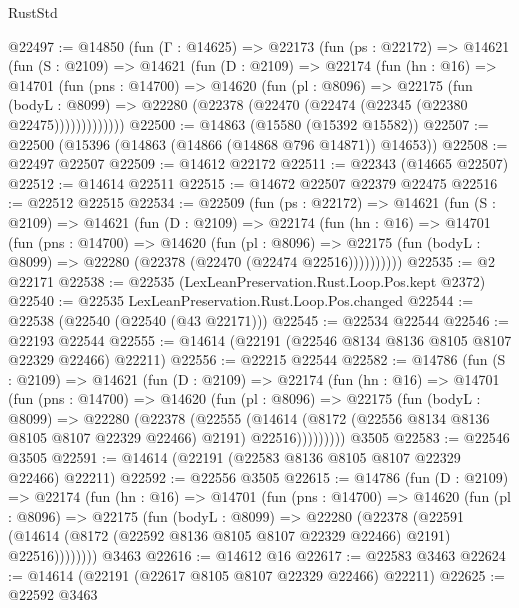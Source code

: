 \begin{lexlean}{RustStd}
\begin{coremodule}
@22497 := @14850
    (fun (Γ : @14625) =>
    @22173
      (fun (ps : @22172) =>
      @14621
        (fun (S : @2109) =>
        @14621
          (fun (D : @2109) =>
          @22174
            (fun (hn : @16) =>
            @14701
              (fun (pns : @14700) =>
              @14620
                (fun (pl : @8096) =>
                @22175
                  (fun (bodyL : @8099) =>
                  @22280 (@22378 (@22470 (@22474 (@22345 (@22380 @22475)))))))))))))
@22500 := @14863 (@15580 (@15392 @15582))
@22507 := @22500 (@15396 (@14863 (@14866 (@14868 @796 @14871)) @14653))
@22508 := @22497 @22507
@22509 := @14612 @22172
@22511 := @22343 (@14665 @22507)
@22512 := @14614 @22511
@22515 := @14672 @22507 @22379 @22475
@22516 := @22512 @22515
@22534 := @22509
    (fun (ps : @22172) =>
    @14621
      (fun (S : @2109) =>
      @14621
        (fun (D : @2109) =>
        @22174
          (fun (hn : @16) =>
          @14701
            (fun (pns : @14700) =>
            @14620
              (fun (pl : @8096) =>
              @22175 (fun (bodyL : @8099) => @22280 (@22378 (@22470 (@22474 @22516))))))))))
@22535 := @2 @22171
@22538 := @22535 (LexLeanPreservation.Rust.Loop.Pos.kept @2372)
@22540 := @22535 LexLeanPreservation.Rust.Loop.Pos.changed
@22544 := @22538 (@22540 (@22540 (@43 @22171)))
@22545 := @22534 @22544
@22546 := @22193 @22544
@22555 := @14614 (@22191 (@22546 @8134 @8136 @8105 @8107 @22329 @22466) @22211)
@22556 := @22215 @22544
@22582 := @14786
    (fun (S : @2109) =>
    @14621
      (fun (D : @2109) =>
      @22174
        (fun (hn : @16) =>
        @14701
          (fun (pns : @14700) =>
          @14620
            (fun (pl : @8096) =>
            @22175
              (fun (bodyL : @8099) =>
              @22280
                (@22378
                  (@22555
                    (@14614
                      (@8172 (@22556 @8134 @8136 @8105 @8107 @22329 @22466) @2191)
                      @22516)))))))))
    @3505
@22583 := @22546 @3505
@22591 := @14614 (@22191 (@22583 @8136 @8105 @8107 @22329 @22466) @22211)
@22592 := @22556 @3505
@22615 := @14786
    (fun (D : @2109) =>
    @22174
      (fun (hn : @16) =>
      @14701
        (fun (pns : @14700) =>
        @14620
          (fun (pl : @8096) =>
          @22175
            (fun (bodyL : @8099) =>
            @22280
              (@22378
                (@22591
                  (@14614 (@8172 (@22592 @8136 @8105 @8107 @22329 @22466) @2191) @22516))))))))
    @3463
@22616 := @14612 @16
@22617 := @22583 @3463
@22624 := @14614 (@22191 (@22617 @8105 @8107 @22329 @22466) @22211)
@22625 := @22592 @3463

\end{coremodule}
\end{lexlean}
